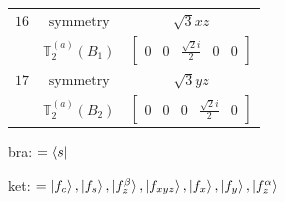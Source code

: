 \documentclass[fleqn,8pt,landscape]{jsarticle}
\begin{document}
\begin{longtable}{ccc}
$ 16 $ & $ \text{symmetry} $ & $ \sqrt{3} x z $ \\
$  $ & $ \mathbb{T}_{2}^{(a)}(B_{1}) $ & $ \begin{bmatrix} 0 & 0 & \frac{\sqrt{2} i}{2} & 0 & 0 \end{bmatrix} $ \\ \hline
$ 17 $ & $ \text{symmetry} $ & $ \sqrt{3} y z $ \\
$  $ & $ \mathbb{T}_{2}^{(a)}(B_{2}) $ & $ \begin{bmatrix} 0 & 0 & 0 & \frac{\sqrt{2} i}{2} & 0 \end{bmatrix} $ \\ \hline
\end{longtable}
bra: $=\bra{s}$

\noindent
ket: $=\ket{f_{c}}, \ket{f_{s}}, \ket{f_{z}^{\beta}}, \ket{f_{xyz}}, \ket{f_{x}}, \ket{f_{y}}, \ket{f_{z}^{\alpha}}$
\renewcommand{\arraystretch}{1.6}
\end{document}
